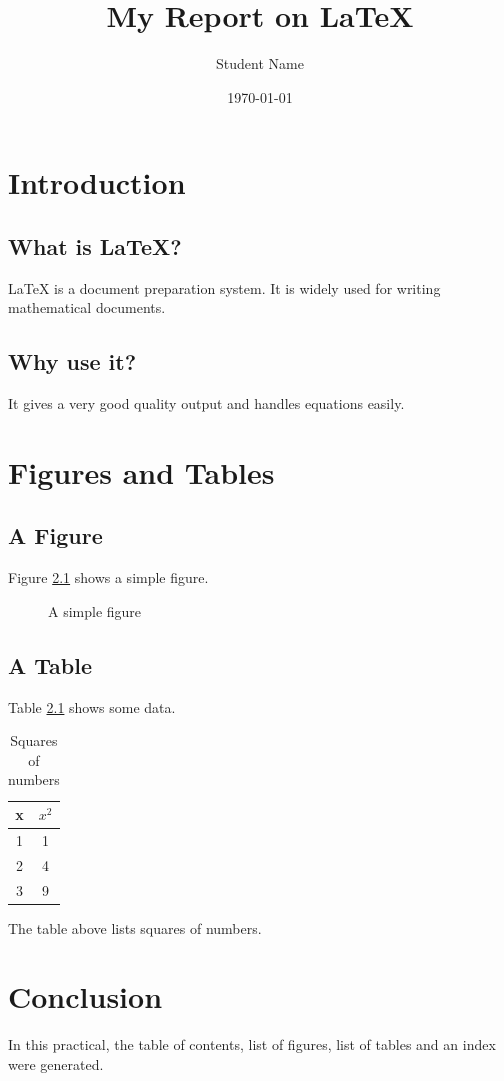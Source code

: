 \documentclass[12pt]{report}
\begin{document}
\title{My Report on \LaTeX{}}
\author{Student Name}
\date{\today}
\maketitle

\tableofcontents
\listoffigures
\listoftables

\chapter{Introduction}
\section{What is \LaTeX{}?}
\LaTeX{} is a document preparation system. It is widely used for writing mathematical documents.

\section{Why use it?}
It gives a very good quality output and handles equations easily.

\chapter{Figures and Tables}
\section{A Figure}
Figure \ref{fig:box} shows a simple figure.

\begin{figure}[h]
\centering
{}
\caption{A simple figure}
\label{fig:box}
\end{figure}

\section{A Table}
Table \ref{tab:data} shows some data.

\begin{table}[h]
\centering
\begin{tabular}{|c|c|}
\hline
x & $x^2$ \\
\hline
1 & 1 \\
2 & 4 \\
3 & 9 \\
\hline
\end{tabular}
\caption{Squares of numbers}
\label{tab:data}
\end{table}

The table above lists squares of numbers.

\chapter{Conclusion}
In this practical, the table of contents, list of figures, list of tables and an index were generated.

\printindex
\end{document}

